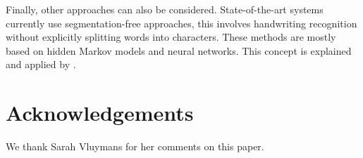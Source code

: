 \documentclass{article}
\begin{document}
Finally, other approaches can also be considered.
State-of-the-art systems currently use segmentation-free approaches, this involves handwriting recognition without explicitly splitting words into characters. These methods are mostly based on hidden Markov models and neural networks.
This concept is explained and applied by \cite{presham}.
\section*{Acknowledgements}
We thank Sarah Vluymans for her comments on this paper.


\end{document}
